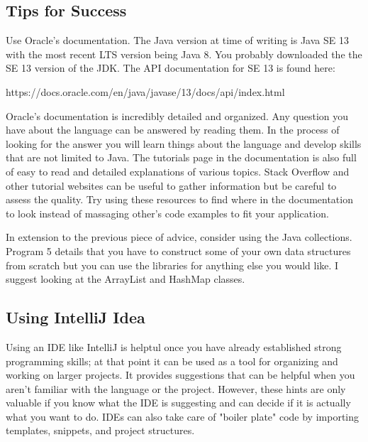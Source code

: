 \documentclass[../../main.tex]{subfiles}
\begin{document}
\subsection{Tips for Success}
Use Oracle's documentation. The Java version at time of writing is Java
SE 13 with the most recent LTS version being Java 8.
You probably downloaded the the SE 13 version of the JDK. The API
documentation for SE 13 is found here:

\vspace{.5em}

https://docs.oracle.com/en/java/javase/13/docs/api/index.html

\vspace{.5em}

Oracle's documentation is incredibly detailed and organized. Any question you have about the language can be answered by
reading them. In the process of looking for the answer you will learn things about the language and develop skills that are not
limited to Java. The tutorials page in the documentation is also full of easy to read and detailed explanations of various topics.
Stack Overflow and other tutorial websites can be useful to gather information but be careful to assess the quality. Try using
these resources to find where in the documentation to look instead of massaging other's code examples to fit your application.

\vspace{.5em}

In extension to the previous piece of advice, consider using the Java collections. Program 5 details that you have to construct
some of your own data structures from scratch but you can use the libraries for anything else you would like. I suggest looking
at the ArrayList and HashMap classes.

\subsection{Using IntelliJ Idea}
Using an IDE like IntelliJ is helptul once you have already established strong programming skills; at
that point it can be used as a tool for organizing and working on larger projects. It provides suggestions
that can be helpful when you aren't familiar with the language or the project. However, these hints are
only valuable if you know what the IDE is suggesting and can decide if it is actually what you want to do.
IDEs can also take care of "boiler plate" code by importing templates, snippets, and project structures.
\end{document}
